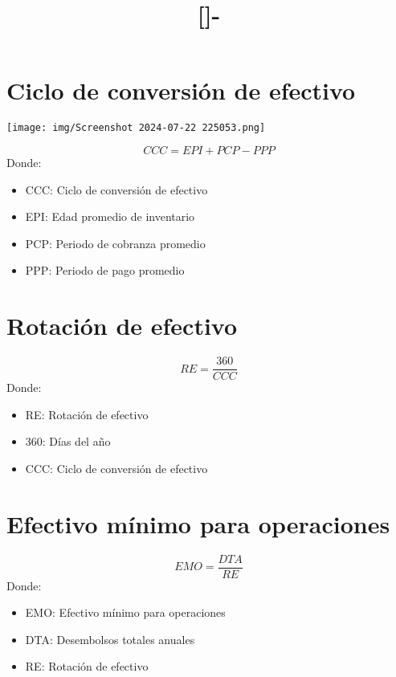 \documentclass{templateNote}
\begin{document}

\title{[\asignatura]-\titulo}
\author{
    \autor
}
\portada
\margenes %

\section{Ciclo de conversión de efectivo}
\begin{center}
    \texttt{[image: img/Screenshot 2024-07-22 225053.png]}
\end{center}
\begin{equation*}
    CCC = EPI + PCP - PPP
\end{equation*}
Donde:
\begin{itemize}
    \item CCC: Ciclo de conversión de efectivo
    \item EPI: Edad promedio de inventario
    \item PCP: Periodo de cobranza promedio
    \item PPP: Periodo de pago promedio
\end{itemize}

\newpage
\section{Rotación de efectivo}
\begin{equation*}
    RE = \frac{360}{CCC}
\end{equation*}
Donde:
\begin{itemize}
    \item RE: Rotación de efectivo
    \item 360: Días del año
    \item CCC: Ciclo de conversión de efectivo
\end{itemize}

\section{Efectivo mínimo para operaciones}
\begin{equation*}
    EMO = \frac{DTA}{RE}
\end{equation*}
Donde:
\begin{itemize}
    \item EMO: Efectivo mínimo para operaciones
    \item DTA: Desembolsos totales anuales
    \item RE: Rotación de efectivo
\end{itemize}
\end{document}
